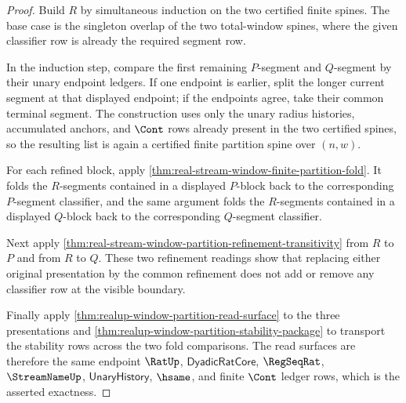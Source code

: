 \begin{proof}
Build $R$ by simultaneous induction on the two certified finite spines. The
base case is the singleton overlap of the two total-window spines, where the
given classifier row is already the required segment row.

In the induction step, compare the first remaining $P$-segment and
$Q$-segment by their unary endpoint ledgers. If one endpoint is earlier, split
the longer current segment at that displayed endpoint; if the endpoints agree,
take their common terminal segment. The construction uses only the unary
radius histories, accumulated anchors, and $\Cont$ rows already present in the
two certified spines, so the resulting list is again a certified finite
partition spine over $(n,w)$.

For each refined block, apply
\autoref{thm:real-stream-window-finite-partition-fold}. It folds the
$R$-segments contained in a displayed $P$-block back to the corresponding
$P$-segment classifier, and the same argument folds the $R$-segments contained
in a displayed $Q$-block back to the corresponding $Q$-segment classifier.

Next apply
\autoref{thm:real-stream-window-partition-refinement-transitivity} from $R$
to $P$ and from $R$ to $Q$. These two refinement readings show that replacing
either original presentation by the common refinement does not add or remove
any classifier row at the visible boundary.

Finally apply \autoref{thm:realup-window-partition-read-surface} to the three
presentations and
\autoref{thm:realup-window-partition-stability-package} to transport the
stability rows across the two fold comparisons. The read surfaces are
therefore the same endpoint $\RatUp$, $\mathsf{DyadicRatCore}$,
$\RegSeqRat$, $\StreamNameUp$, $\mathsf{UnaryHistory}$, $\hsame$, and finite
$\Cont$ ledger rows, which is the asserted exactness.
\end{proof}
